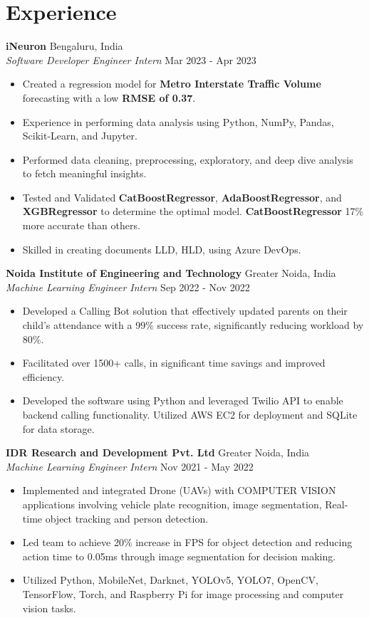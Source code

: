 \documentclass[11pt]{article}
\begin{document}
\section*{Experience}
\textbf{iNeuron} \hfill Bengaluru, India \\
\textit{Software Developer Engineer Intern} \hfill Mar 2023 - Apr 2023
\begin{itemize}
  \item Created a regression model for \textbf{Metro Interstate Traffic Volume} forecasting with a low \textbf{RMSE of 0.37}.
  \item Experience in performing data analysis using Python, NumPy, Pandas, Scikit-Learn, and Jupyter.
  \item Performed data cleaning, preprocessing, exploratory, and deep dive analysis to fetch meaningful insights.
  \item Tested and Validated \textbf{CatBoostRegressor}, \textbf{AdaBoostRegressor}, and \textbf{XGBRegressor} to determine the optimal model. \textbf{CatBoostRegressor} 17\% more accurate than others.
  \item Skilled in creating documents LLD, HLD, using Azure DevOps.
\end{itemize}

\textbf{Noida Institute of Engineering and Technology} \hfill Greater Noida, India \\
\textit{Machine Learning Engineer Intern} \hfill Sep 2022 - Nov 2022
\begin{itemize}
  \item Developed a Calling Bot solution that effectively updated parents on their child’s attendance with a 99\% success rate, significantly reducing workload by 80\%.
  \item Facilitated over 1500+ calls, in significant time savings and improved efficiency.
  \item Developed the software using Python and leveraged Twilio API to enable backend calling functionality. Utilized AWS EC2 for deployment and SQLite for data storage.
\end{itemize}

\textbf{IDR Research and Development Pvt. Ltd} \hfill Greater Noida, India \\
\textit{Machine Learning Engineer Intern} \hfill Nov 2021 - May 2022
\begin{itemize}
  \item Implemented and integrated Drone (UAVs) with COMPUTER VISION applications involving vehicle plate recognition, image segmentation, Real-time object tracking and person detection.
  \item Led team to achieve 20\% increase in FPS for object detection and reducing action time to 0.05ms through image segmentation for decision making.
  \item Utilized Python, MobileNet, Darknet, YOLOv5, YOLO7, OpenCV, TensorFlow, Torch, and Raspberry Pi for image processing and computer vision tasks.
\end{itemize}
\end{document}
